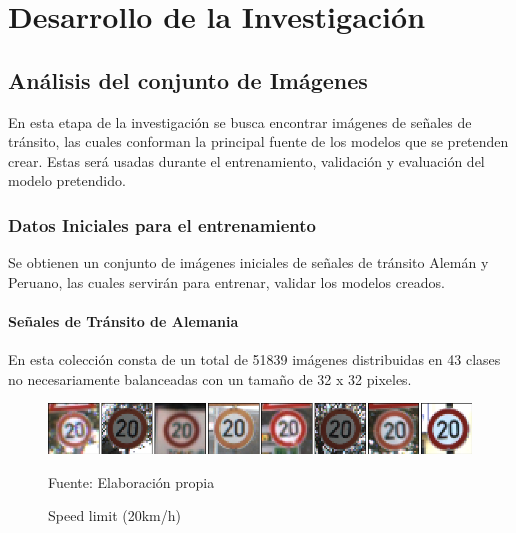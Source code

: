\chapter{Desarrollo de la Investigación}
\setcounter{page}{75}
\renewcommand{\baselinestretch}{1.2} %

\section{Análisis del conjunto de Imágenes}
	
	En esta etapa de la investigación se busca encontrar imágenes de señales de tránsito, las cuales conforman la principal fuente de los modelos que se pretenden crear. Estas será usadas durante el entrenamiento, validación y evaluación del modelo pretendido.
	
	\subsection{Datos Iniciales para el entrenamiento}
		Se obtienen un conjunto de imágenes iniciales de señales de tránsito Alemán y Peruano, las cuales servirán para entrenar, validar los modelos creados.
		\subsubsection{Señales de Tránsito de Alemania}

			En esta colección consta de un total de 51839 imágenes distribuidas en 43 clases no necesariamente balanceadas con un tamaño de 32 x 32 pixeles.

			\begin{figure}[H]
				\begin{center}
				\includegraphics[width=1\textwidth]{images/desarrollo/imagenes/alemania/1__(1).png}
				\end{center}
				\begin{center}
				\caption{\small{Speed limit (20km/h)}}
				\vskip -0.25cm
				{\small{Fuente: Elaboración propia}}
				\end{center}
				\vspace{-1.5em}
			\end{figure}



